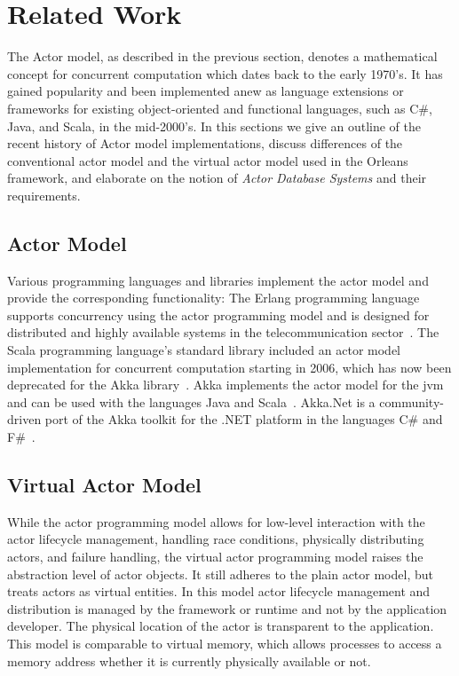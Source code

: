 
\section{Related Work}\label{sec:related_work}

  The Actor model, as described in the previous section, denotes a mathematical concept for concurrent computation which dates back to the early 1970's.
  It has gained popularity and been implemented anew as language extensions or frameworks for existing object-oriented and functional languages, such as C\#, Java, and Scala, in the mid-2000's.
  In this sections we give an outline of the recent history of Actor model implementations,
  discuss differences of the conventional actor model and the virtual actor model used in the Orleans framework,
  and elaborate on the notion of \textit{Actor Database Systems} and their requirements.

  \subsection{Actor Model}
  Various programming languages and libraries implement the actor model and provide the corresponding functionality:
  The Erlang programming language supports concurrency using the actor programming model and is designed for distributed and highly available systems in the telecommunication sector~\cite{armstrong:erlang}.
  The Scala programming language's standard library included an actor model implementation for concurrent computation starting in 2006, which has now been deprecated for the Akka library~\cite{Haller:2012}.
  Akka implements the actor model for the \gls{jvm} and can be used with the languages Java and Scala~\cite{akka}.
  Akka.Net is a community-driven port of the Akka toolkit for the .NET platform in the languages C\# and F\#~\cite{akka.net}.

  \subsection{Virtual Actor Model}
  While the actor programming model allows for low-level interaction with the actor lifecycle management, handling race conditions, physically distributing actors, and failure handling, the virtual actor programming model raises the abstraction level of actor objects.
  It still adheres to the plain actor model, but treats actors as virtual entities.
  In this model actor lifecycle management and distribution is managed by the framework or runtime and not by the application developer.
  The physical location of the actor is transparent to the application.
  This model is comparable to virtual memory, which allows processes to access a memory address whether it is currently physically available or not.

